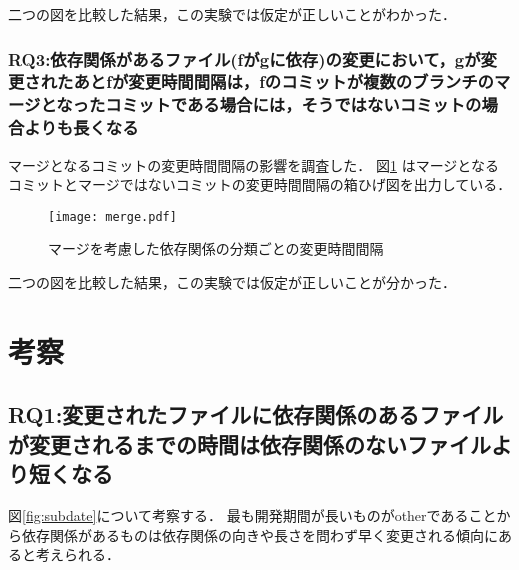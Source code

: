 \documentclass{fose2016}           %
\begin{document}
二つの図を比較した結果，この実験では仮定が正しいことがわかった．

\subsubsection*{RQ3:依存関係があるファイル(fがgに依存)の変更において，gが変更されたあとfが変更時間間隔は，fのコミットが複数のブランチのマージとなったコミットである場合には，そうではないコミットの場合よりも長くなる}
マージとなるコミットの変更時間間隔の影響を調査した．
図\ref{fig:merge_subdate} はマージとなるコミットとマージではないコミットの変更時間間隔の箱ひげ図を出力している．

\begin{figure}[t]
\centering
\texttt{[image: merge.pdf]}
\caption{マージを考慮した依存関係の分類ごとの変更時間間隔}
\label{fig:merge_subdate} 
\end{figure}

二つの図を比較した結果，この実験では仮定が正しいことが分かった．

\section{考察}\label{考察}

\subsection{RQ1:変更されたファイルに依存関係のあるファイルが変更されるまでの時間は依存関係のないファイルより短くなる}
図\ref{fig:subdate}について考察する．
最も開発期間が長いものがotherであることから依存関係があるものは依存関係の向きや長さを問わず早く変更される傾向にあると考えられる．
\end{document}
